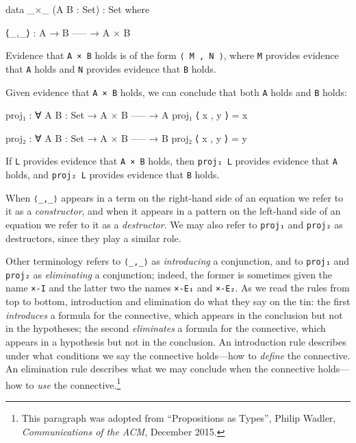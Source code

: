 \begin{fence}
\begin{code}
data _×_ (A B : Set) : Set where

  ⟨_,_⟩ :
      A
    → B
      -----
    → A × B
\end{code}
\end{fence}

Evidence that \texttt{A\ ×\ B} holds is of the form
\texttt{⟨\ M\ ,\ N\ ⟩}, where \texttt{M} provides evidence that
\texttt{A} holds and \texttt{N} provides evidence that \texttt{B} holds.

Given evidence that \texttt{A\ ×\ B} holds, we can conclude that both
\texttt{A} holds and \texttt{B} holds:

\begin{fence}
\begin{code}
proj₁ : ∀ {A B : Set}
  → A × B
    -----
  → A
proj₁ ⟨ x , y ⟩ = x

proj₂ : ∀ {A B : Set}
  → A × B
    -----
  → B
proj₂ ⟨ x , y ⟩ = y
\end{code}
\end{fence}

If \texttt{L} provides evidence that \texttt{A\ ×\ B} holds, then
\texttt{proj₁\ L} provides evidence that \texttt{A} holds, and
\texttt{proj₂\ L} provides evidence that \texttt{B} holds.

When \texttt{⟨\_,\_⟩} appears in a term on the right-hand side of an
equation we refer to it as a \emph{constructor}, and when it appears in
a pattern on the left-hand side of an equation we refer to it as a
\emph{destructor}. We may also refer to \texttt{proj₁} and
\texttt{proj₂} as destructors, since they play a similar role.

Other terminology refers to \texttt{⟨\_,\_⟩} as \emph{introducing} a
conjunction, and to \texttt{proj₁} and \texttt{proj₂} as
\emph{eliminating} a conjunction; indeed, the former is sometimes given
the name \texttt{×-I} and the latter two the names \texttt{×-E₁} and
\texttt{×-E₂}. As we read the rules from top to bottom, introduction and
elimination do what they say on the tin: the first \emph{introduces} a
formula for the connective, which appears in the conclusion but not in
the hypotheses; the second \emph{eliminates} a formula for the
connective, which appears in a hypothesis but not in the conclusion. An
introduction rule describes under what conditions we say the connective
holds---how to \emph{define} the connective. An elimination rule
describes what we may conclude when the connective holds---how to
\emph{use} the connective.\footnote{This paragraph was adopted from
  ``Propositions as Types'', Philip Wadler, \emph{Communications of the
  ACM}, December 2015.}

